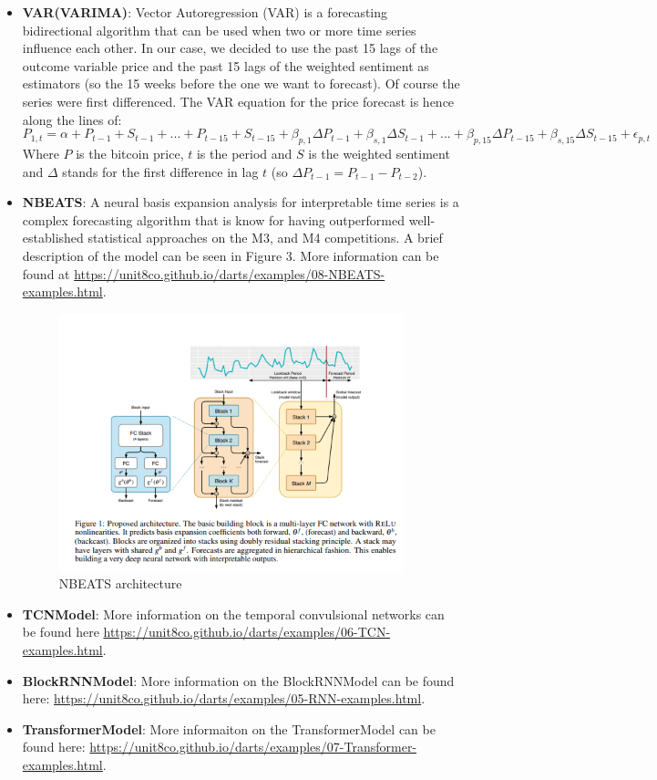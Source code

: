 \documentclass{article}
\begin{document}
\begin{itemize}
    \item \textbf{VAR(VARIMA)}: Vector Autoregression (VAR) is a forecasting bidirectional algorithm that can be used when two or more time series influence each other. In our case, we decided to use the past 15 lags of the outcome variable price and the past 15 lags of the weighted sentiment as estimators (so the 15 weeks before the one we want to forecast). Of course the series were first differenced.
    The VAR equation for the price forecast is hence along the lines of: 
    \[P_{1,t} = \alpha + P_{t-1} + S_{t-1} + ... + P_{t-15} + S_{t-15} + \beta_{p,1} \Delta P_{t-1}+ \beta_{s,1} \Delta S_{t-1} + ... + \beta_{p,15} \Delta P_{t-15}+ \beta_{s, 15} \Delta S_{t-15}+ \epsilon_{p,t}\]
    Where $P$ is the bitcoin price, $t$ is the period and $S$ is the weighted sentiment and $\Delta$ stands for the first difference in lag $t$ (so $\Delta P_{t-1} = P_{t-1}-P_{t-2}$). 
    \item \textbf{NBEATS}: A neural basis expansion analysis for interpretable time series is a complex forecasting algorithm that is know for having outperformed well-established statistical approaches on the M3, and M4 competitions. A brief description of the model can be seen in Figure 3. More information can be found at \url{https://unit8co.github.io/darts/examples/08-NBEATS-examples.html}. 
    \begin{figure}[h]
        \centering
        \includegraphics[width = 10cm]{NBEATS.png}
        \caption{NBEATS architecture}
        \label{fig:my_label}
    \end{figure}
    \item \textbf{TCNModel}: More information on the temporal convulsional networks can be found here \url{https://unit8co.github.io/darts/examples/06-TCN-examples.html}. 
    \item \textbf{BlockRNNModel}: More information on the BlockRNNModel can be found here: \url{https://unit8co.github.io/darts/examples/05-RNN-examples.html}.
    \item \textbf{TransformerModel}: More informaiton on the TransformerModel can be found here: \url{https://unit8co.github.io/darts/examples/07-Transformer-examples.html}.
\end{itemize}
\end{document}

